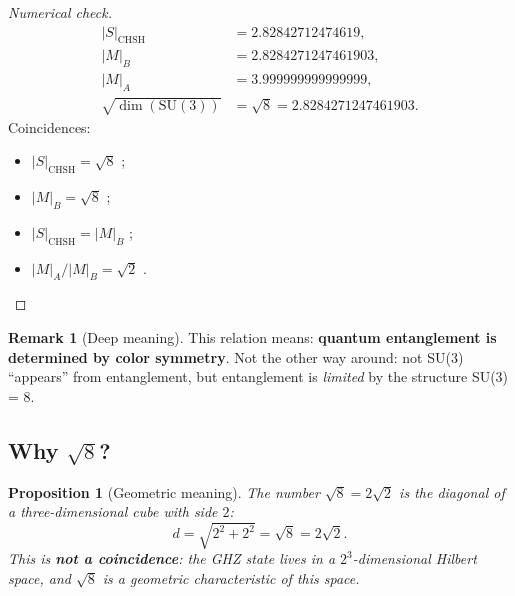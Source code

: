 \documentclass[11pt,a4paper]{article}
\newcommand{\SU}{\mathrm{SU}}
\newtheorem{proposition}[theorem]{Proposition}
\theoremstyle{definition}
\newtheorem{remark}[theorem]{Remark}
\begin{document}
\begin{proof}[Numerical check]
\begin{align}
    |S|_{\text{CHSH}} &= 2.82842712474619, \\
    |M|_B &= 2.8284271247461903, \\
    |M|_A &= 3.999999999999999, \\
    \sqrt{\dim(\SU(3))} &= \sqrt{8} = 2.8284271247461903.
\end{align}
Coincidences:
\begin{itemize}
    \item $|S|_{\text{CHSH}} = \sqrt{8}$ \checkmark;
    \item $|M|_B = \sqrt{8}$ \checkmark;
    \item $|S|_{\text{CHSH}} = |M|_B$ \checkmark;
    \item $|M|_A / |M|_B = \sqrt{2}$ \checkmark.
\end{itemize}
\end{proof}

\begin{remark}[Deep meaning]
\label{rem:entanglement-deep}
This relation means: \textbf{quantum entanglement 
is determined by color symmetry}. Not the other way around: not SU(3) 
``appears'' from entanglement, but entanglement is \emph{limited} 
by the structure SU(3) = 8.
\end{remark}

\subsection{Why $\sqrt{8}$?}
\label{subsec:why-sqrt-8}

\begin{proposition}[Geometric meaning]
\label{prop:sqrt-8-geometric}
The number $\sqrt{8} = 2\sqrt{2}$ is the \emph{diagonal} 
of a three-dimensional cube with side $2$:
\begin{equation}
    d = \sqrt{2^2 + 2^2} = \sqrt{8} = 2\sqrt{2}.
\end{equation}
This is \textbf{not a coincidence}: the GHZ state lives in a 
$2^3$-dimensional Hilbert space, and $\sqrt{8}$ is a 
\emph{geometric} characteristic of this space.
\end{proposition}
\end{document}
